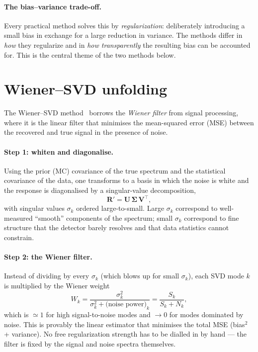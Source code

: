 \documentclass[11pt]{article}
\newcommand{\R}{\mathbf{R}}
\begin{document}
\paragraph{The bias--variance trade-off.}
Every practical method solves this by \emph{regularization}: deliberately introducing a
small bias in exchange for a large reduction in variance. The methods differ in
\emph{how} they regularize and in \emph{how transparently} the resulting bias can be
accounted for. This is the central theme of the two methods below.

\section{Wiener--SVD unfolding}
\label{sec:wsvd}

The Wiener--SVD method~\cite{tang2017} borrows the \emph{Wiener filter} from signal
processing, where it is the linear filter that minimises the mean-squared error (MSE)
between the recovered and true signal in the presence of noise.

\paragraph{Step 1: whiten and diagonalise.}
Using the prior (MC) covariance of the true spectrum and the statistical covariance of
the data, one transforms to a basis in which the noise is white and the response is
diagonalised by a singular-value decomposition,
\begin{equation}
  \R' = \mathbf{U}\,\mathbf{\Sigma}\,\mathbf{V}^{\!\top},
\end{equation}
with singular values $\sigma_k$ ordered large-to-small. Large $\sigma_k$ correspond to
well-measured ``smooth'' components of the spectrum; small $\sigma_k$ correspond to fine
structure that the detector barely resolves and that data statistics cannot constrain.

\paragraph{Step 2: the Wiener filter.}
Instead of dividing by every $\sigma_k$ (which blows up for small $\sigma_k$), each SVD
mode $k$ is multiplied by the Wiener weight
\begin{equation}
  W_k = \frac{\sigma_k^2}{\sigma_k^2 + \text{(noise power)}_k}
      = \frac{S_k}{S_k+N_k},
  \label{eq:wiener}
\end{equation}
which is $\simeq 1$ for high signal-to-noise modes and $\to 0$ for modes dominated by
noise. This is provably the linear estimator that minimises the total MSE
(bias$^2$ + variance). No free regularization strength has to be dialled in by hand ---
the filter is fixed by the signal and noise spectra themselves.
\end{document}
